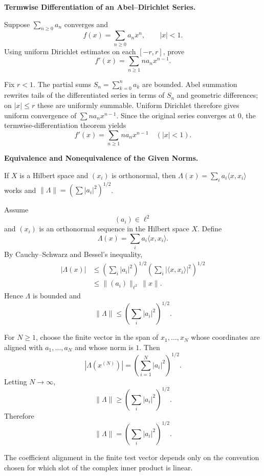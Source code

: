 \begin{problem}[CP-II-0505]
\label{prob:cp-ii-0505}
\textbf{Termwise Differentiation of an Abel--Dirichlet Series.}

\hspace*{1.5em}Suppose \(\sum_{n\ge0}a_n\) converges and
\[
f(x)=\sum_{n\ge0}a_nx^n,\qquad |x|<1.
\]
Using uniform Dirichlet estimates on each \([-r,r]\), prove
\[
f'(x)=\sum_{n\ge1}na_nx^{n-1}.
\]
\end{problem}

\begin{solution}
Fix \(r<1\). The partial sums \(S_n=\sum_{k=0}^na_k\) are bounded. Abel summation rewrites tails of the differentiated series in terms of \(S_n\) and geometric differences; on \(|x|\le r\) these are uniformly summable. Uniform Dirichlet therefore gives uniform convergence of \(\sum na_nx^{n-1}\). Since the original series converges at \(0\), the termwise-differentiation theorem yields
\[
\boxed{f'(x)=\sum_{n\ge1}na_nx^{n-1}\quad(|x|<1).}
\]
\end{solution}


\begin{problem}[CP-II-0507]
\label{prob:cp-ii-0507}
\textbf{Equivalence and Nonequivalence of the Given Norms.}

\hspace*{1.5em}If $X$ is a Hilbert space and $(x_i)$ is orthonormal, then $\Lambda(x)=\sum_i a_i\langle x,x_i\rangle$ works and
	$\|\Lambda\|=(\sum |a_i|^2)^{1/2}$.

	\bigskip
\end{problem}

\begin{solution}
Assume
\[
(a_i)\in\ell^2
\]
and \((x_i)\) is an orthonormal sequence in the Hilbert space \(X\). Define
\[
\Lambda(x)
=
\sum_i a_i\langle x,x_i\rangle.
\]
By Cauchy--Schwarz and Bessel's inequality,
\[
\begin{aligned}
|\Lambda(x)|
&\le
\left(\sum_i|a_i|^2\right)^{1/2}
\left(\sum_i|\langle x,x_i\rangle|^2\right)^{1/2}\\
&\le
\|(a_i)\|_{\ell^2}\,\|x\|.
\end{aligned}
\]
Hence \(\Lambda\) is bounded and
\[
\|\Lambda\|
\le
\left(\sum_i|a_i|^2\right)^{1/2}.
\]

For \(N\ge1\), choose the finite vector in the span of \(x_1,\ldots,x_N\) whose coordinates
are aligned with \(a_1,\ldots,a_N\) and whose norm is \(1\). Then
\[
|\Lambda(x^{(N)})|
=
\left(
\sum_{i=1}^{N}|a_i|^2
\right)^{1/2}.
\]
Letting \(N\to\infty\),
\[
\|\Lambda\|
\ge
\left(
\sum_i|a_i|^2
\right)^{1/2}.
\]
Therefore
\[
\boxed{
\|\Lambda\|
=
\left(
\sum_i|a_i|^2
\right)^{1/2}.
}
\]

The coefficient alignment in the finite test vector depends only on the convention chosen
for which slot of the complex inner product is linear.
\end{solution}


